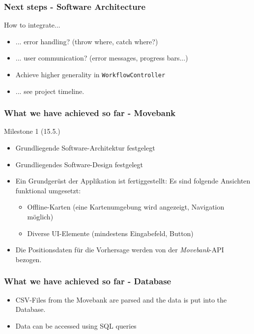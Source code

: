 \documentclass[xcolor=dvipsnames]{beamer}
\begin{document}
\begin{frame}
	\frametitle{Next steps - Software Architecture}
	How to integrate...
	\begin{itemize}
		\item ... error handling? (throw where, catch where?)
		\item ... user communication? (error messages, progress bars...)
	\end{itemize}
	\lstset{style=normalstyle}
	\begin{itemize}
		\item Achieve higher generality in \lstinline$WorkflowController$
	\end{itemize}
	\begin{itemize}
	 	 \item ... see project timeline.
	\end{itemize}
\end{frame}




\begin{frame}
	\frametitle{What we have achieved so far - Movebank}
	\Large{Milestone 1 (15.5.)}
	\normalsize
	\begin{itemize} 
		\item \color{LightGray}Grundliegende Software-Architektur festgelegt
		\item \color{LightGray}Grundliegendes Software-Design festgelegt
		\item \color{LightGray}Ein Grundgerüst der Applikation ist fertiggestellt: Es sind folgende Ansichten funktional umgesetzt:
		\begin{itemize} 
			\item \color{LightGray}Offline-Karten (eine Kartenumgebung wird angezeigt, Navigation möglich)
			\item \color{LightGray}Diverse UI-Elemente (mindestens Eingabefeld, Button)
		\end{itemize} 
		\item \color{Green}Die Positionsdaten für die Vorhersage werden von der \textit{Movebank}-API bezogen.
	\end{itemize}     
\end{frame}




\begin{frame}
	\frametitle{What we have achieved so far - Database}
    
	\begin{itemize}
		\item CSV-Files from the Movebank are parsed and the data is put into the Database.
		\item Data can be accessed using SQL queries
	\end{itemize}
    
\end{frame}
\end{document}
